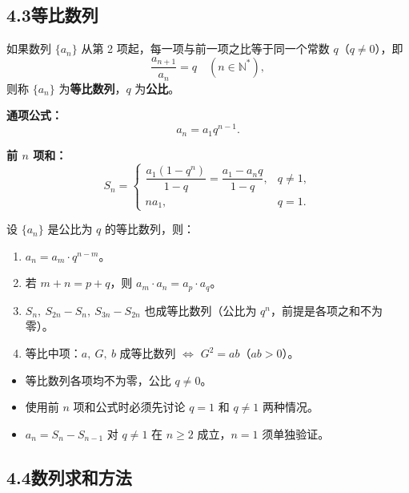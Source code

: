 \documentclass[12pt, a4paper]{ctexart}
\begin{document}
\subsection*{4.3\quad 等比数列}

\begin{knowledgebox}[定义]
如果数列 $\{a_n\}$ 从第 2 项起，每一项与前一项之比等于同一个常数 $q$（$q \neq 0$），即
\[
  \frac{a_{n+1}}{a_n} = q \quad (n \in \mathbb{N}^*),
\]
则称 $\{a_n\}$ 为\textbf{等比数列}，$q$ 为\textbf{公比}。
\end{knowledgebox}

\medskip

\noindent\textbf{通项公式：}
\[
  a_n = a_1 q^{n-1}.
\]

\noindent\textbf{前 $n$ 项和：}
\[
  S_n = \begin{cases} \dfrac{a_1(1 - q^n)}{1 - q} = \dfrac{a_1 - a_n q}{1 - q}, & q \neq 1,\\[8pt] na_1, & q = 1. \end{cases}
\]

\begin{tipbox}[等比数列的性质]
设 $\{a_n\}$ 是公比为 $q$ 的等比数列，则：
\begin{enumerate}[label=(\arabic*)]
  \item $a_n = a_m \cdot q^{n - m}$。
  \item 若 $m + n = p + q$，则 $a_m \cdot a_n = a_p \cdot a_q$。
  \item $S_n,\ S_{2n} - S_n,\ S_{3n} - S_{2n}$ 也成等比数列（公比为 $q^n$，前提是各项之和不为零）。
  \item 等比中项：$a,\ G,\ b$ 成等比数列 $\Longleftrightarrow$ $G^2 = ab$（$ab > 0$）。
\end{enumerate}
\end{tipbox}

\begin{warnbox}[易错提醒]
\begin{itemize}
  \item 等比数列各项均不为零，公比 $q \neq 0$。
  \item 使用前 $n$ 项和公式时必须先讨论 $q = 1$ 和 $q \neq 1$ 两种情况。
  \item $a_n = S_n - S_{n-1}$ 对 $q \neq 1$ 在 $n \geqslant 2$ 成立，$n=1$ 须单独验证。
\end{itemize}
\end{warnbox}

\subsection*{4.4\quad 数列求和方法}
\end{document}
